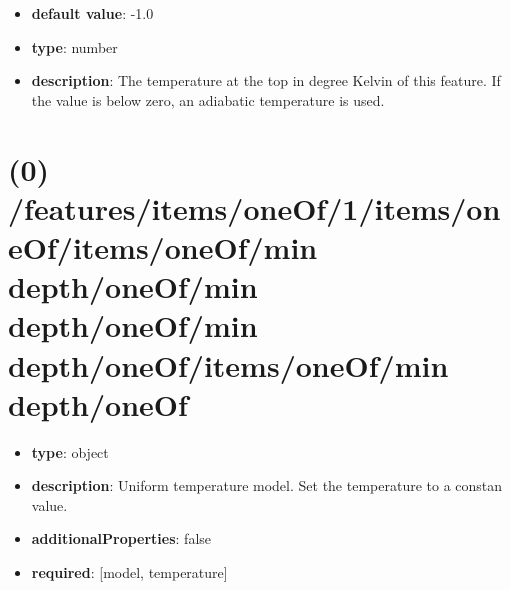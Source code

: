 \begin{itemize}[leftmargin=0em]\item {\bf default value}: -1.0
\item {\bf type}: number
\item {\bf description}: The temperature at the top in degree Kelvin of this feature. If the value is below zero, an adiabatic temperature is used.
\end{itemize}\section{(0) /features/items/oneOf/1/items/oneOf/items/oneOf/min depth/oneOf/min depth/oneOf/min depth/oneOf/items/oneOf/min depth/oneOf}
\begin{itemize}[leftmargin=0em]\item {\bf type}: object
\item {\bf description}: Uniform temperature model. Set the temperature to a constan value.
\item {\bf additionalProperties}: false
\item {\bf required}: [model, temperature]\end{itemize}
